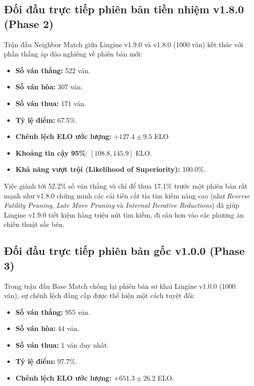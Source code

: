 \subsection{Đối đầu trực tiếp phiên bản tiền nhiệm v1.8.0 (Phase 2)}

Trận đấu Neighbor Match giữa Lingine v1.9.0 và v1.8.0 (1000 ván) kết thúc với phần thắng áp đảo nghiêng về phiên bản mới:
\begin{itemize}
    \item \textbf{Số ván thắng:} 522 ván.
    \item \textbf{Số ván hòa:} 307 ván.
    \item \textbf{Số ván thua:} 171 ván.
    \item \textbf{Tỷ lệ điểm:} 67.5\%.
    \item \textbf{Chênh lệch ELO ước lượng:} $\mathbf{+127.4 \pm 9.5}$ ELO 
    \item \textbf{Khoảng tin cậy 95\%}: $[108.8, 145.9]$ ELO.
    \item \textbf{Khả năng vượt trội (Likelihood of Superiority):} 100.0\%.
\end{itemize}

Việc giành tới 52.2\% số ván thắng và chỉ để thua 17.1\% trước một phiên bản rất mạnh như v1.8.0 chứng minh các cải tiến cắt tỉa tìm kiếm nâng cao (như \textit{Reverse Futility Pruning}, \textit{Late Move Pruning} và \textit{Internal Iterative Reductions}) đã giúp Lingine v1.9.0 tiết kiệm hàng triệu nút tìm kiếm, đi sâu hơn vào các phương án chiến thuật sắc bén.

\subsection{Đối đầu trực tiếp phiên bản gốc v1.0.0 (Phase 3)}

Trong trận đấu Base Match chống lại phiên bản sơ khai Lingine v1.0.0 (1000 ván), sự chênh lệch đẳng cấp được thể hiện một cách tuyệt đối:
\begin{itemize}
    \item \textbf{Số ván thắng:} 955 ván.
    \item \textbf{Số ván hòa:} 44 ván.
    \item \textbf{Số ván thua:} 1 ván duy nhất.
    \item \textbf{Tỷ lệ điểm:} 97.7\%.
    \item \textbf{Chênh lệch ELO ước lượng:} $\mathbf{+651.3 \pm 26.2}$ ELO.
\end{itemize}

